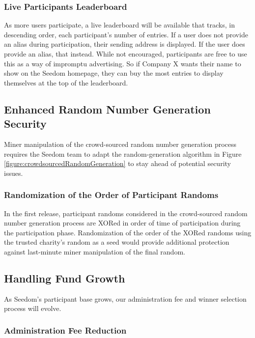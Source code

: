 \documentclass[11pt]{article}
\begin{document}
\subsubsection{Live Participants Leaderboard}

As more users participate, a live leaderboard will be available that tracks, in descending order, each participant's number of entries. If a user does not provide an alias during participation, their sending address is displayed. If the user does provide an alias, that instead. While not encouraged, participants are free to use this as a way of impromptu advertising. So if Company X wants their name to show on the Seedom homepage, they can buy the most entries to display themselves at the top of the leaderboard.

\subsection{Enhanced Random Number Generation Security}

Miner manipulation of the crowd-sourced random number generation process requires the Seedom team to adapt the random-generation algorithm in Figure \ref{figure:crowdsourcedRandomGeneration} to stay ahead of potential security issues.

\subsubsection{Randomization of the Order of Participant Randoms}

In the first release, participant randoms considered in the crowd-sourced random number generation process are XORed in order of time of participation during the participation phase. Randomization of the order of the XORed randoms using the trusted charity's random as a seed would provide additional protection against last-minute miner manipulation of the final random.

\subsection{Handling Fund Growth}

As Seedom's participant base grows, our administration fee and winner selection process will evolve.

\subsubsection{Administration Fee Reduction}
\end{document}
